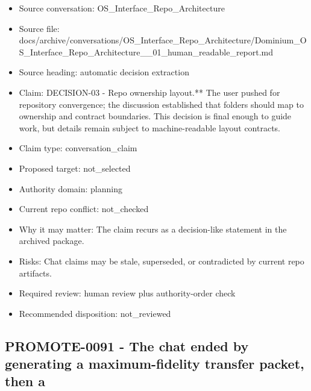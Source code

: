 \documentclass[11pt,a4paper]{report}
\begin{document}
\begin{itemize}
\item Source conversation: OS\_Interface\_Repo\_Architecture
\item Source file: docs/archive/conversations/OS\_Interface\_Repo\_Architecture/Dominium\_OS\_Interface\_Repo\_Architecture\_\_01\_human\_readable\_report.md
\item Source heading: automatic decision extraction
\item Claim: DECISION-03 - Repo ownership layout.** The user pushed for repository convergence; the discussion established that folders should map to ownership and contract boundaries. This decision is final enough to guide work, but details remain subject to machine-readable layout contracts.
\item Claim type: conversation\_claim
\item Proposed target: not\_selected
\item Authority domain: planning
\item Current repo conflict: not\_checked
\item Why it may matter: The claim recurs as a decision-like statement in the archived package.
\item Risks: Chat claims may be stale, superseded, or contradicted by current repo artifacts.
\item Required review: human review plus authority-order check
\item Recommended disposition: not\_reviewed
\end{itemize}

\subsection{PROMOTE-0091 - The chat ended by generating a maximum-fidelity transfer packet, then a}
\end{document}
